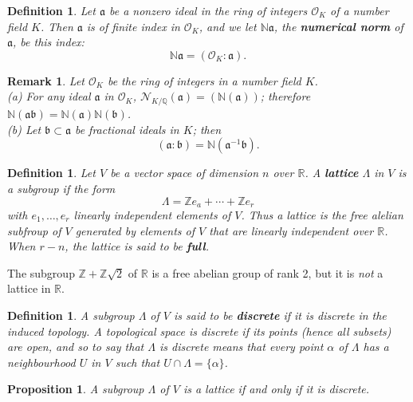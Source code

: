 \documentclass[11pt,a4paper,reqno]{amsart}
\numberwithin{equation}{section}
\newtheorem{prop}[thm]{Proposition}
\newtheorem{defn}[thm]{Definition}
\newtheorem{rmk}[thm]{Remark}
\begin{document}
\begin{defn}
Let $\mathfrak{a}$ be a nonzero ideal in the ring of integers $\mathcal{O}_K$ of a number field $K$.
 Then $\mathfrak{a}$ is of finite index in $\mathcal{O}_K$, and we let $\mathbb{N}\mathfrak{a}$,
 the \textbf{numerical norm} of $\mathfrak{a}$, be this index:
\[
\mathbb{N}\mathfrak{a}=(\mathcal{O}_K : \mathfrak{a}).
\]
\end{defn}

\begin{rmk}
Let $\mathcal{O}_K$ be the ring of integers in a number field $K$.\\
(a) For any ideal $\mathfrak{a}$ in $\mathcal{O}_K$, ${\mathcal{N}_{K/\mathbb{Q}}}(\mathfrak{a})=(\mathbb{N}(\mathfrak{a}))$;
 therefore $\mathbb{N}(\mathfrak{a} \mathfrak{b} )=\mathbb{N}(\mathfrak{a})\mathbb{N}(\mathfrak{b})$.\\
(b) Let $\mathfrak{b} \subset \mathfrak{a}$ be fractional ideals in $K$; then 
\[
(\mathfrak{a} : \mathfrak{b} )=\mathbb{N}(\mathfrak{a}^{-1} \mathfrak{b} ).
\]
\end{rmk}

\begin{defn}
Let $V$ be a vector space of dimension $n$ over $\mathbb{R}$.
 A \textbf{lattice} $\Lambda$ in $V$ is a subgroup if the form
\[
\Lambda = \mathbb{Z} e_a + \cdots + \mathbb{Z} e_r
\]
with $e_1, \dots , e_r$ linearly independent elements of $V$.
 Thus a lattice is the free alelian subfroup of $V$ generated by elements of $V$ that are linearly independent over $\mathbb{R}$.
 When $r-n$, the lattice is said to be \textbf{full}.
\end{defn}

The subgroup $\mathbb{Z} + \mathbb{Z}\sqrt{2}$ of $\mathbb{R}$ is a free abelian group of rank 2, but it is \textit{not} a lattice in $\mathbb{R}$.

\begin{defn}
A subgroup $\Lambda$ of $V$ is said to be \textbf{discrete}
 if it is discrete in the induced topology.
 A topological space is discrete if its points (hence all subsets) are open,
 and so to say that $\Lambda$ is discrete means
 that every point $\alpha$ of $\Lambda$ has a neighbourhood $U$ in $V$ such that $U \cap \Lambda = \{ \alpha \}$.
\end{defn}

\begin{prop}
A subgroup $\Lambda$ of $V$ is a lattice if and only if it is discrete.
\end{prop}
\end{document}
